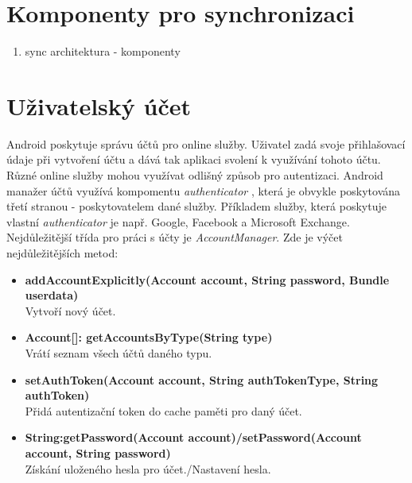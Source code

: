 \documentclass{diplomka}
\begin{document}
\section{Komponenty pro synchronizaci}
\begin{enumerate}
\item sync architektura - komponenty
\end{enumerate}



\section{Uživatelský účet}
Android poskytuje správu účtů pro online služby. Uživatel zadá svoje přihlašovací údaje při vytvoření účtu a dává tak aplikaci svolení k využívání tohoto účtu.\\ \indent
Různé online služby mohou využívat odlišný způsob pro autentizaci. Android manažer účtů využívá kompomentu \emph{authenticator} \cite{accman}, která je obvykle poskytována třetí stranou - poskytovatelem dané služby. Příkladem služby, která poskytuje vlastní \emph{authenticator} je např. Google, Facebook a Microsoft Exchange.\\ \indent
Nejdůležitější třída pro práci s účty je \emph{AccountManager}. Zde je výčet nejdůležitějších metod:
\begin{itemize}[]
\item \textbf{addAccountExplicitly(Account account, String password, Bundle userdata)}\\
Vytvoří nový účet.
\item \textbf{Account[]: getAccountsByType(String type)}\\
Vrátí seznam všech účtů daného typu.
\item \textbf{setAuthToken(Account account, String authTokenType, String authToken)}\\
Přidá autentizační token do cache paměti pro daný účet.
\item \textbf{String:getPassword(Account account)/setPassword(Account account, String password)}\\
Získání uloženého hesla pro účet./Nastavení hesla.
\end{itemize}
\end{document}
